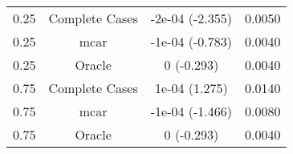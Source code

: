 \begin{table}[ht]
\centering
\begin{tabular}{cccc}
  \hline
  \hline
0.25 & Complete Cases & -2e-04 (-2.355) & 0.0050 \\ 
  0.25 & mcar & -1e-04 (-0.783) & 0.0040 \\ 
  0.25 & Oracle & 0 (-0.293) & 0.0040 \\ 
  0.75 & Complete Cases & 1e-04 (1.275) & 0.0140 \\ 
  0.75 & mcar & -1e-04 (-1.466) & 0.0080 \\ 
  0.75 & Oracle & 0 (-0.293) & 0.0040 \\ 
   \hline
\end{tabular}
\end{table}
